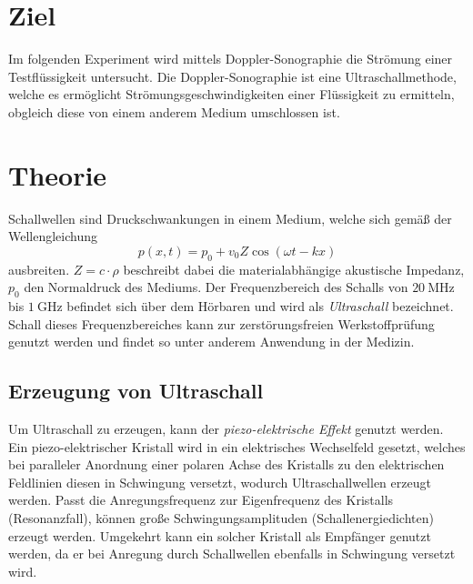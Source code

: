 \section{Ziel}
\label{sec:Ziel}
Im folgenden Experiment wird mittels Doppler-Sonographie die Strömung einer Testflüssigkeit untersucht. Die Doppler-Sonographie ist eine Ultraschallmethode, welche es ermöglicht
Strömungsgeschwindigkeiten einer Flüssigkeit zu ermitteln, obgleich diese von einem anderem Medium umschlossen ist.   
\section{Theorie}
\label{sec:Theorie}
Schallwellen sind Druckschwankungen in einem Medium, welche sich gemäß der Wellengleichung
\begin{equation*}
    \label{eqn:Schallwelle}
    p(x,t) = p_0 + v_0 Z \cos \left(\omega t - kx\right)
\end{equation*}
ausbreiten. $Z = c \cdot \rho$ beschreibt dabei die materialabhängige akustische Impedanz, $p_0$ den Normaldruck des Mediums.
Der Frequenzbereich des Schalls von $\qty{20}{\mega\hertz}$ bis $\qty{1}{\giga\hertz}$ befindet sich über dem Hörbaren und wird als \textit{Ultraschall} bezeichnet.
Schall dieses Frequenzbereiches kann zur zerstörungsfreien Werkstoffprüfung genutzt werden und findet so unter anderem Anwendung in der Medizin. \\

\subsection{Erzeugung von Ultraschall}
\label{subsec:Erzeugung}
Um Ultraschall zu erzeugen, kann der \textit{piezo-elektrische Effekt} genutzt werden. Ein piezo-elektrischer Kristall wird in ein elektrisches Wechselfeld gesetzt,
welches bei paralleler Anordnung einer polaren Achse des Kristalls zu den elektrischen Feldlinien diesen in Schwingung versetzt, wodurch Ultraschallwellen erzeugt werden. 
Passt die Anregungsfrequenz zur Eigenfrequenz des Kristalls (Resonanzfall), können große Schwingungsamplituden (Schallenergiedichten) erzeugt werden. 
Umgekehrt kann ein solcher Kristall als Empfänger genutzt werden, da er bei Anregung durch Schallwellen ebenfalls in Schwingung versetzt wird. \\

